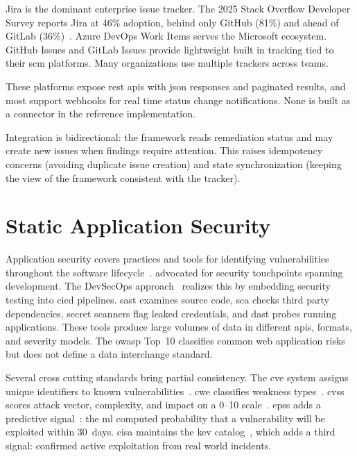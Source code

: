 Jira is the dominant enterprise issue tracker. The 2025 Stack Overflow Developer Survey reports Jira at 46\% adoption, behind only GitHub (81\%) and ahead of GitLab (36\%)~\cite{StackOverflow2025}. Azure DevOps Work Items serves the Microsoft ecosystem. GitHub Issues and GitLab Issues provide lightweight built in tracking tied to their \gls{scm} platforms. Many organizations use multiple trackers across teams.

These platforms expose \gls{rest} \glspl{api} with \gls{json} responses and paginated results, and most support webhooks for real time status change notifications. None is built as a connector in the reference implementation. 

Integration is bidirectional: the framework reads remediation status and may create new issues when findings require attention. This raises idempotency concerns (avoiding duplicate issue creation) and state synchronization (keeping the view of the framework consistent with the tracker).


\section{Static Application Security}
\label{sec:static-appsec}

Application security covers practices and tools for identifying vulnerabilities throughout the software lifecycle~\cite{Anderson2020, Stallings2024}. \textcite{McGraw2006} advocated for security touchpoints spanning development. The DevSecOps approach~\cite{Mack2023, Kim2021} realizes this by embedding security testing into \gls{cicd} pipelines. \Gls{sast} examines source code, \gls{sca} checks third party dependencies, secret scanners flag leaked credentials, and \gls{dast} probes running applications. These tools produce large volumes of data in different \glspl{api}, formats, and severity models. The \gls{owasp} Top~10 classifies common web application risks~\cite{OWASP2021} but does not define a data interchange standard.

Several cross cutting standards bring partial consistency. The \gls{cve} system assigns unique identifiers to known vulnerabilities~\cite{MITRE2024}. \Gls{cwe} classifies weakness types~\cite{CWE2024}. \Gls{cvss} scores attack vector, complexity, and impact on a 0--10 scale~\cite{FIRST2019}. \Gls{epss} adds a predictive signal~\cite{Jacobs2020}: the \gls{ml} computed probability that a vulnerability will be exploited within 30~days. \Gls{cisa} maintains the \gls{kev} catalog~\cite{CISAKEV2024}, which adds a third signal: confirmed active exploitation from real world incidents.

